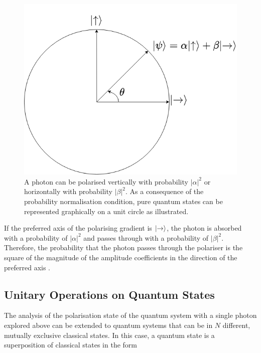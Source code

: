 \begin{figure}
	\centering
	\includegraphics[width=0.45\linewidth]{body/ch2/figs/photon-polarization-circle}
	\caption[Graphical Representation of a Photon Polarisation State.]{A photon can be polarised vertically with probability $|\alpha|^2$ or horizontally with probability $|\beta|^2$. As a consequence of the probability normalisation condition, pure quantum states can be represented graphically on a unit circle as illustrated.}
	\label{fig:photon-polarization-circle}
\end{figure}
If the preferred axis of the polarising gradient is $\ket{\rightarrow}$, the photon is absorbed with a probability of $|\alpha|^2$ and passes through with a probability of $|\beta|^2$. Therefore, the probability that the photon passes through the polariser is the square of the magnitude of the amplitude coefficients in the direction of the preferred axis \cite{Rieffel2011}.

\subsection{Unitary Operations on Quantum States \label{subsec:unitary-ops}}

The analysis of the polarisation state of the quantum system with a single photon explored above can be extended to quantum systems that can be in $N$ different, mutually exclusive classical states. In this case, a quantum state is a superposition of classical states in the form

